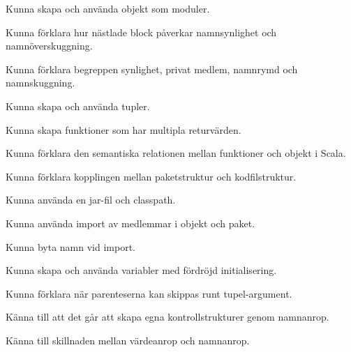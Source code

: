 
\item Kunna skapa och använda objekt som moduler.
\item Kunna förklara hur nästlade block påverkar namnsynlighet och namnöverskuggning.
\item Kunna förklara begreppen synlighet, privat medlem, namnrymd och namnskuggning.

\item Kunna skapa och använda tupler.
\item Kunna skapa funktioner som har multipla returvärden.
\item Kunna förklara den semantiska relationen mellan funktioner och objekt i Scala.

\item Kunna förklara kopplingen mellan paketstruktur och kodfilstruktur.
\item Kunna använda en jar-fil och classpath.

\item Kunna använda import av medlemmar i objekt och paket.
\item Kunna byta namn vid import.

\item Kunna skapa och använda variabler med fördröjd initialisering.
\item Kunna förklara när parenteserna kan skippas runt tupel-argument.

\item Känna till att det går att skapa egna kontrollstrukturer genom namnanrop.
\item Känna till skillnaden mellan värdeanrop och namnanrop.
